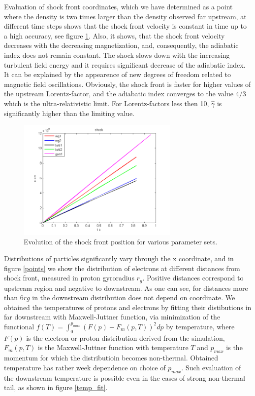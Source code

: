 \documentclass[a4paper]{jpconf}
\begin{document}
	Evaluation of shock front coordinates, which we have determined as a point where  the density is two times larger than the density observed far upstream, at different time steps shows that the shock front velocity is constant in time up to a high accuracy, see figure \ref{shock_x}. Also, it shows, that the shock front velocity decreases with the decreasing magnetization, and, consequently, the adiabatic index does not remain constant. The shock slows down with the increasing turbulent field energy and it requires significant decrease of the adiabatic index. It can be explained by the appearence of new degrees of freedom related to magnetic field oscillations. Obviously, the shock front is faster for higher values of the upstream Lorentz-factor, and the adiabatic index  converges to the value $4/3$ which is the ultra-relativistic limit. For Lorentz-factors less then 10, $\hat{\gamma}$ is significantly higher than the limiting value. 
	
	
	\begin{figure}[h!]
		\centering
		\includegraphics[width=0.7\textwidth]{fig/shock_x.png} 
		\caption{Evolution of the shock front position for various parameter sets.}
		\label{shock_x}
	\end{figure}
	
	Distributions of particles significantly vary through the x coordinate, and in figure \ref{points} we show the distribution of electrons at different distances from shock front, measured in proton gyroradius $r_g$. Positive distances correspond to upstream region and negative to downstream. As one can see, for distances more than $6 rg$ in the downstream distribution does not depend on coordinate.  We obtained the temperatures of protons and electrons by fitting their distibutions in far downstream with Maxwell-Juttner function, via minimization of the functional $f(T) = \int_{0}^{p_{max}} (F(p) - F_{m}(p,T))^2dp$ by temperature, where $F(p)$ is the electron or proton distribution derived from the simulation, $F_{m}(p,T)$ is the Maxwell-Juttner function with temperature $T$ and $p_{max}$ is the momentum for which the distributioin becomes non-thermal. Obtained temperature has rather week dependence on choice of $p_{max}$. Such evaluation of the downstream temperature is possible even in the cases of strong non-thermal tail, as shown in figure \ref{temp_fit}.
	
\end{document}
